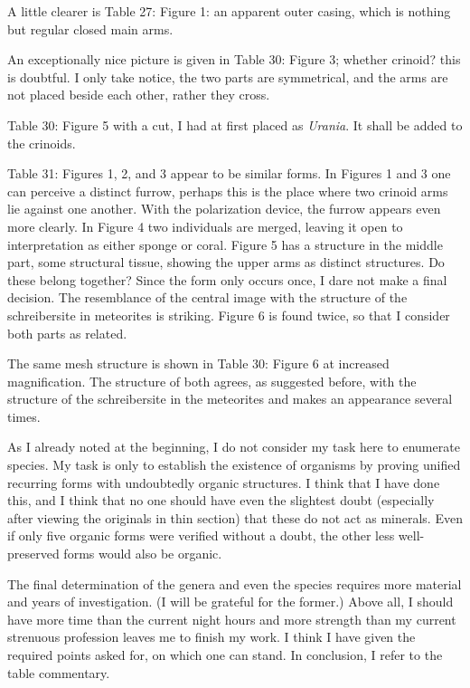 \documentclass[a4paper, 12pt, oneside]{article}
\begin{document}
A little clearer is Table 27: Figure 1: an apparent outer casing, which is nothing but regular closed main arms.

An exceptionally nice picture is given in Table 30: Figure 3; whether crinoid? this is doubtful. I only take notice, the two parts are symmetrical, and the arms are not placed beside each other, rather they cross.

Table 30: Figure 5 with a cut, I had at first placed as \emph{Urania}. It shall be added to the crinoids.

Table 31: Figures 1, 2, and 3 appear to be similar forms. In Figures 1 and 3 one can perceive a distinct furrow, perhaps this is the place where two crinoid arms lie against one another. With the polarization device, the furrow appears even more clearly. In Figure 4 two individuals are merged, leaving it open to interpretation as either sponge or coral. Figure 5 has a structure in the middle part, some structural tissue, showing the upper arms as distinct structures. Do these belong together? Since the form only occurs once, I dare not make a final decision. The resemblance of the central image with the structure of the schreibersite in meteorites is striking. Figure 6 is found twice, so that I consider both parts as related.

The same mesh structure is shown in Table 30: Figure 6 at increased magnification. The structure of both agrees, as suggested before, with the structure of the schreibersite in the meteorites and makes an appearance several times.

As I already noted at the beginning, I do not consider my task here to enumerate species. My task is only to establish the existence of organisms by proving unified recurring forms with undoubtedly organic structures. I think that I have done this, and I think that no one should have even the slightest doubt (especially after viewing the originals in thin section) that these do not act as minerals. Even if only five organic forms were verified without a doubt, the other less well-preserved forms would also be organic.

The final determination of the genera and even the species requires more material and years of investigation. (I will be grateful for the former.) Above all, I should have more time than the current night hours and more strength than my current strenuous profession leaves me to finish my work. I think I have given the required points asked for, on which one can stand. In conclusion, I refer to the table commentary.
\end{document}
